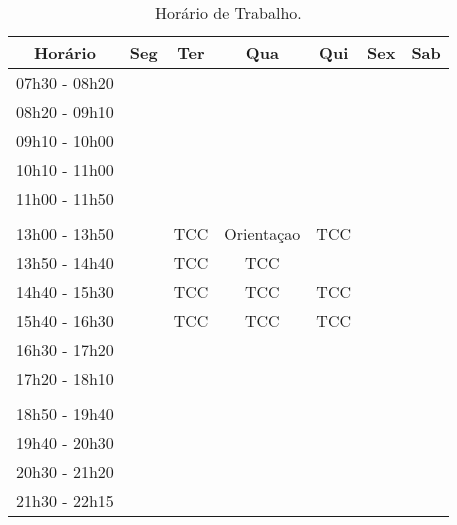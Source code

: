 \begin{table}[!htb]
	\centering
	\caption{Horário de Trabalho.\label{tab:tabela02}}
	\begin{tabular}{c|c|c|c|c|c|c}
		\hline
		\textbf{Horário} & \textbf{Seg} & \textbf{Ter} & \textbf{Qua} & \textbf{Qui} & \textbf{Sex} & \textbf{Sab} \\
		\hline
		\small{07h30 - 08h20} &   &   &   &   &   &   \\
		\hline
		\small{08h20 - 09h10} &   &   &   &   &   &   \\
		\hline
		\small{09h10 - 10h00} &   &   &  &  &   &   \\
		\hline
		\small{10h10 - 11h00} &   &   &   &   &  &   \\
		\hline
		\small{11h00 - 11h50} &   &   &   &   &   & \\
		\hline
		\small{} &   &   &   &   &   & \\
		\hline
		\small{13h00 - 13h50} &   & TCC & Orientaçao & TCC &   & \\
		\hline
		\small{13h50 - 14h40} &   & TCC & TCC &   &   & \\
		\hline
		\small{14h40 - 15h30} &   & TCC & TCC & TCC &   & \\
		\hline
		\small{15h40 - 16h30} &   & TCC & TCC & TCC &   & \\
		\hline
		\small{16h30 - 17h20} &   &   &   &   &   & \\
		\hline
		\small{17h20 - 18h10} &   &   &   &   &   & \\
		\hline
		\small{} &   &   &   &   &   & \\
		\hline
		\small{18h50 - 19h40} &   &   &   &   &   & \\
		\hline
		\small{19h40 - 20h30} &   &   &   &   &   & \\
		\hline
		\small{20h30 - 21h20} &   &   &   &   &   & \\
		\hline
		\small{21h30 - 22h15} &   &   &   &   &   & \\
		\hline
	\end{tabular}
\end{table}




